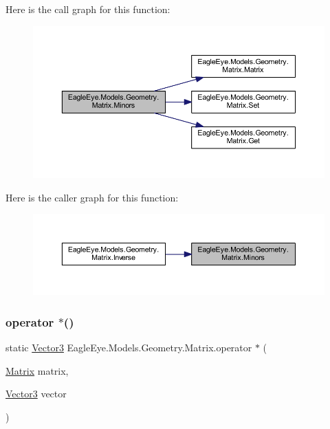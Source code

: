 Here is the call graph for this function\+:\nopagebreak
\begin{figure}[H]
\begin{center}
\leavevmode
\includegraphics[width=350pt]{class_eagle_eye_1_1_models_1_1_geometry_1_1_matrix_a121833737b07b1791264d0f4f10a621b_cgraph}
\end{center}
\end{figure}
Here is the caller graph for this function\+:\nopagebreak
\begin{figure}[H]
\begin{center}
\leavevmode
\includegraphics[width=350pt]{class_eagle_eye_1_1_models_1_1_geometry_1_1_matrix_a121833737b07b1791264d0f4f10a621b_icgraph}
\end{center}
\end{figure}
\mbox{\label{class_eagle_eye_1_1_models_1_1_geometry_1_1_matrix_a44614ac72efc9134ff0cf4e35f8ae343}} 
\subsubsection{\texorpdfstring{operator $\ast$()}{operator *()}\hspace{0.1cm}{\footnotesize\ttfamily [1/4]}}
{\footnotesize\ttfamily static \mbox{\hyperlink{struct_eagle_eye_1_1_models_1_1_geometry_1_1_vector3}{Vector3}} Eagle\+Eye.\+Models.\+Geometry.\+Matrix.\+operator $\ast$ (\begin{DoxyParamCaption}\item[{\mbox{\hyperlink{class_eagle_eye_1_1_models_1_1_geometry_1_1_matrix}{Matrix}}}]{matrix,  }\item[{\mbox{\hyperlink{struct_eagle_eye_1_1_models_1_1_geometry_1_1_vector3}{Vector3}}}]{vector }\end{DoxyParamCaption})\hspace{0.3cm}{\ttfamily [static]}}

